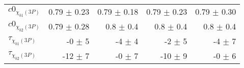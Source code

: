 \begin{table}[H]
{{\begin{tabular}{lrrrr}
\rule{0pt}{4ex}$c0_{\chi_{b1}(3P)}$ & 0.79 $\pm$ 0.23 & 0.79 $\pm$ 0.18 & 0.79 $\pm$ 0.23 & 0.79 $\pm$ 0.30\\
$c0_{\chi_{b2}(3P)}$ & 0.79 $\pm$ 0.28 & 0.8 $\pm$ 0.4 & 0.8 $\pm$ 0.4 & 0.8 $\pm$ 0.4\\

\rule{0pt}{4ex}$\tau_{\chi_{b1}(3P)}$ & -0 $\pm$ 5 & -4 $\pm$ 4 & -2 $\pm$ 5 & -4 $\pm$ 7\\
$\tau_{\chi_{b2}(3P)}$ & -12 $\pm$ 7 & -0 $\pm$ 7 & -10 $\pm$ 9 & -0 $\pm$ 6\\
\bottomrule
\end{tabular}
} %

} %
\label{tab:mc:chib3p_ups3s:fits}
\end{table}